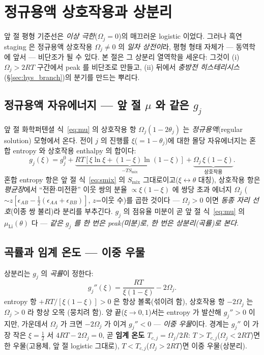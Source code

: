 \documentclass[11pt,a4paper]{article}
\begin{document}
\section{정규용액 상호작용과 상분리}\label{sec:regsol}
앞 절 평형 기준선은 \emph{이상 극한}($\Omega_j=0$)의 매끄러운 logistic 이었다. 그러나 흑연 staging 은 정규용액
상호작용 $\Omega_j\ne0$ 의 \emph{일차 상전이}라, 평형 형태 자체가 — 동역학에 앞서 — 비단조가 될 수 있다. 본 절은
그 상분리 열역학을 세운다: 그것이 (i) $\Omega_j>2RT$ 구간에서 peak 를 비단조로 만들고, (ii) 뒤에서 \emph{충방전
히스테리시스}(\S\ref{sec:hys_branch})의 분기를 만드는 뿌리다.

\subsection{정규용액 자유에너지 — 앞 절 $\mu$ 와 같은 $g_j$}
앞 절 화학퍼텐셜 식~\eqref{eq:mu} 의 상호작용 항 $\Omega_j(1-2\theta_j)$ 는 \emph{정규용액}(regular solution)
모형에서 온다. 전이 $j$ 의 진행률 $\xi$($=1-\theta_j$)에 대한 몰당 자유에너지는 혼합 entropy 와 상호작용 enthalpy
의 합이다:
\begin{equation}
g_j(\xi)=g_j^0+\underbrace{RT[\xi\ln\xi+(1-\xi)\ln(1-\xi)]}_{-T S_\mathrm{mix}}
+\underbrace{\Omega_j\,\xi(1-\xi)}_{\text{상호작용}}.
\label{eq:regsol_g}
\end{equation}
혼합 entropy 항은 앞 절 식~\eqref{eq:smix} 의 $S_\mathrm{mix}$ 그대로이고($\xi\leftrightarrow\theta$ 대칭), 상호작용
항은 \emph{평균장}에서 ``전환$\cdot$미전환'' 이웃 쌍의 분율 $\propto\xi(1-\xi)$ 에 쌍당 초과 에너지 $\Omega_j$
($\sim z[\epsilon_{AB}-\tfrac12(\epsilon_{AA}+\epsilon_{BB})]$, $z$=이웃 수)를 곱한 것이다 — $\Omega_j>0$ 이면
\emph{동종 자리 선호}(이종 쌍 불리)라 분리를 부추긴다. $g_j$ 의 점유율 미분이 곧 앞 절 식~\eqref{eq:mu} 의
$\mu_\mathrm{Li}(\theta)$ 다 — \emph{같은 $g_j$ 를 한 번은 peak(미분)로, 한 번은 상분리(곡률)로 본다}.

\subsection{곡률과 임계 온도 — 이중 우물}
상분리는 $g_j$ 의 \emph{곡률}이 정한다:
\begin{equation}
g_j''(\xi)=\frac{RT}{\xi(1-\xi)}-2\Omega_j.
\label{eq:regsol_gpp}
\end{equation}
entropy 항 $+RT/[\xi(1-\xi)]>0$ 은 항상 볼록(섞이려 함), 상호작용 항 $-2\Omega_j$ 는 $\Omega_j>0$ 라 항상 오목
(뭉치려 함). 양 끝($\xi\to0,1$)서는 entropy 가 발산해 $g_j''>0$ 이지만, 가운데서 $\Omega_j$ 가 크면 $-2\Omega_j$ 가
이겨 $g_j''<0$ — \emph{이중 우물}이다. 경계는 $g_j''$ 이 가장 작은 $\xi=\tfrac12$ 서 $4RT-2\Omega_j=0$, 곧
\textbf{임계 온도 $T_{c,j}=\Omega_j/2R$}: $T>T_{c,j}$($\Omega_j<2RT$)면 한 우물(고용체, 앞 절 logistic 그대로),
$T<T_{c,j}$($\Omega_j>2RT$)면 이중 우물(상분리).
\end{document}
